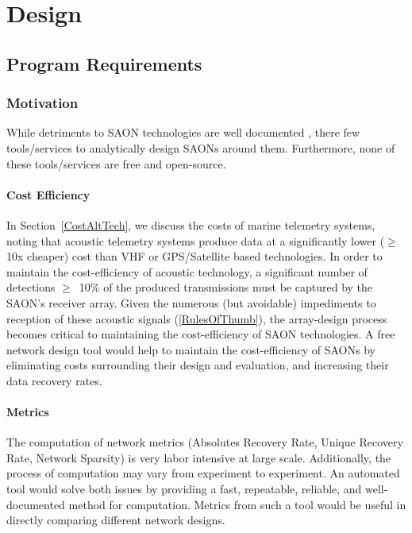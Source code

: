 \chapter{Design}
\label{design}
\section{Program Requirements}
\label{programRequirements}

\subsection{Motivation}
While detriments to SAON technologies are well documented \cite{Akbarzadeh2013} \cite{Heupel2006} \cite{Howard2002}  \cite{Kessel2015} \cite{Steel2014}, there few tools/services to analytically design SAONs around them.  Furthermore, none of these tools/services are free and open-source.


\subsubsection{Cost Efficiency}
\label{motivationCost}
In Section~\ref{CostAltTech}, we discuss the costs of marine telemetry systems, noting that acoustic telemetry systems produce data at a significantly lower ($\ge$10x cheaper) cost than VHF or GPS/Satellite based technologies.  In order to maintain the cost-efficiency of acoustic technology, a significant number of detections $\ge$~10$\%$ of the produced transmissions must be captured by the SAON's receiver array.  Given the numerous (but avoidable) impediments to reception of these acoustic signals (\ref{RulesOfThumb}), the array-design process becomes critical to maintaining the cost-efficiency of SAON technologies.  A free network design tool would help to maintain the cost-efficiency of SAONs by eliminating costs surrounding their design and evaluation, and increasing their data recovery rates.  


\subsubsection{Metrics}
\label{motivationMetrics}
The computation of network metrics (Absolutes Recovery Rate, Unique Recovery Rate, Network Sparsity) is very labor intensive at large scale.  Additionally, the process of computation may vary from experiment to experiment.  An automated tool would solve both issues by providing a fast, repeatable, reliable, and well-documented method for computation.  Metrics from such a tool would be useful in directly comparing different network designs.



